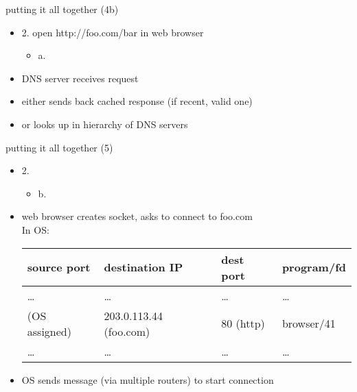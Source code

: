 \begin{frame}{putting it all together (4b)}
    \begin{itemize}
    \item 2. open http://foo.com/bar in web browser
        \begin{itemize}
        \item a. 
        \end{itemize}
    \vspace{.5cm}
    \item DNS server receives request
    \item either sends back cached response (if recent, valid one)
    \item or looks up in hierarchy of DNS servers
    \end{itemize}
\end{frame}

\begin{frame}{putting it all together (5)}
    \begin{itemize}
    \item 2. 
        \begin{itemize}
        \item b. 
        \end{itemize}
    \vspace{.5cm}
\begin{tikzpicture}
\end{tikzpicture}
    \item<2-> web browser creates socket, asks to connect to foo.com \\
    In OS:
\small
\begin{tabular}{llll}
source port & destination IP & dest port & program/fd \\ \hline
\ldots & \ldots & \ldots & \ldots \\
(OS assigned) & 203.0.113.44 (foo.com) & 80 (http) & browser/41 \\
\ldots & \ldots & \ldots & \ldots \\
\end{tabular}
    \item<2-> OS sends message (via multiple routers) to start connection
    \end{itemize}
\end{frame}

